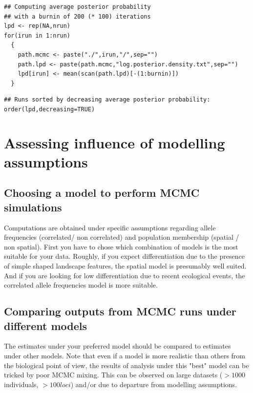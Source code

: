 \documentclass[a4paper,10pt]{article}
\begin{document}
\bigskip

\begin{verbatim}
## Computing average posterior probability
## with a burnin of 200 (* 100) iterations
lpd <- rep(NA,nrun)
for(irun in 1:nrun)
  {
    path.mcmc <- paste("./",irun,"/",sep="")
    path.lpd <- paste(path.mcmc,"log.posterior.density.txt",sep="")
    lpd[irun] <- mean(scan(path.lpd)[-(1:burnin)])
  }
\end{verbatim}



\bigskip

\begin{verbatim}
## Runs sorted by decreasing average posterior probability:
order(lpd,decreasing=TRUE)

\end{verbatim}




\clearpage
\section[Influence of model assumptions]{Assessing influence of modelling assumptions}

\subsection{Choosing a model to perform MCMC simulations}

Computations are obtained under specific assumptions regarding allele frequencies (correlated/ non correlated) 
and population membership (spatial / non spatial). 
First you have to chose which combination of models is the most suitable for your data.
Roughly, if you expect differentiation due to the presence of simple shaped landscape features, the spatial model is presumably well suited. 
And if you are looking for low differentiation due to recent ecological events, the correlated allele frequencies model 
is more suitable. 

\subsection{Comparing outputs from MCMC runs under different models}

The estimates under your preferred model should be compared to estimates under other models. 
Note that even if a model is more realistic than others from the biological point of view, the results of analysis under this 
"best" model can be tricked by poor 
MCMC mixing. This can be    observed on large datasets ($> 1000$ individuals, $>100 loci$) and/or due to departure from modelling assumptions.
\end{document}
